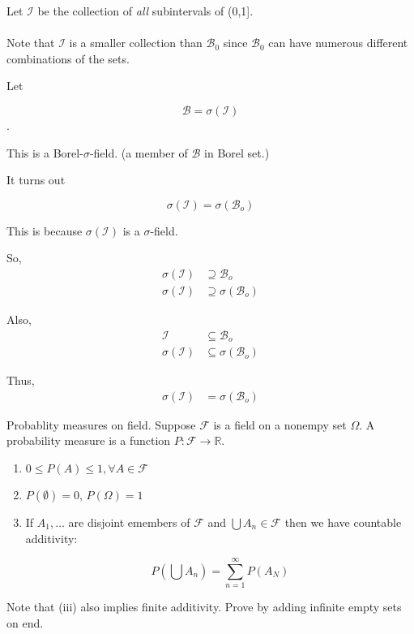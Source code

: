 \documentclass[11pt,fleqn]{book} %
\begin{document}
\begin{example}
	 Let $\mathcal{I}$ be the collection of \textit{all} subintervals of (0,1].\\
	\\
	 Note that $\mathcal{I}$ is a smaller collection than $\mathcal{B}_0$ since $\mathcal{B}_0$ can have numerous different combinations of the sets. 

	 Let

	$$\mathcal{B} = \sigma(\mathcal{I})$$. 

	This is a Borel-$\sigma$-field. (a member of $\mathcal{B}$ in Borel set.)

	It turns out

	$$\sigma(\mathcal{I}) = \sigma(\mathcal{B}_o)  $$

This is because $\sigma(\mathcal{I})$ is a $\sigma$-field. 

So, 
	\begin{align*}
		\sigma(\mathcal{I}) &\supseteq \mathcal{B}_o\\
		\sigma(\mathcal{I}) &\supseteq \sigma(\mathcal{B}_o)
	\end{align*}

Also, 
\begin{align*}
		\mathcal{I} &\subseteq \mathcal{B}_o\\
		\sigma(\mathcal{I}) &\subseteq \sigma(\mathcal{B}_o)
	\end{align*} 

Thus, 
\begin{align*}
	\sigma(\mathcal{I}) &= \sigma(\mathcal{B}_o)
\end{align*}
\end{example}




\begin{definition}

Probablity measures on field. Suppose $\mathcal{F}$ is a field on a nonempy set $\Omega$. A probability measure is a function $P:\mathcal{F} \rightarrow \mathbb{R}$. 

\begin{enumerate}[label = (\roman*)]
	\item $0 \leq P(A) \leq 1, \forall A \in \mathcal{F}$
	\item $P(\emptyset) = 0$, $P(\Omega) = 1$
	\item If $A_1, \dots$ are disjoint emembers of $\mathcal{F}$ and $\bigcup A_n \in \mathcal{F}$ then we have countable additivity:

	$$P (\bigcup A_n) = \displaystyle\sum^\infty_{n=1} P(A_N) $$
\end{enumerate}

\begin{remark}
	Note that (iii) also implies finite additivity. Prove by adding infinite empty sets on end. 
\end{remark}

	
\end{definition}
\end{document}
